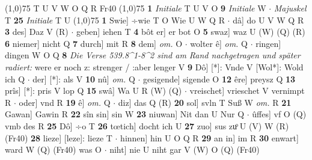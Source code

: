 \documentclass[8pt,a4paper,notitlepage]{article}
\begin{document}
\begin{table}[ht]
\begin{minipage}[t]{0.5\linewidth}
\scriptsize
\line(1,0){75} \newline
T U V W O Q R Fr40 \newline
\line(1,0){75} \newline
\textbf{1} \textit{Initiale} T U V O  \textbf{9} \textit{Initiale} W   $\cdot$ \textit{Majuskel} T  \textbf{25} \textit{Initiale} T U  \newline
\line(1,0){75} \newline
\textbf{1} Swie] ÷wie T O Wie U W Q R  $\cdot$ dâ] do U V W Q R \textbf{3} des] Daz V (R)  $\cdot$ geben] iehen T \textbf{4} bôt er] er bot O \textbf{5} swaz] waz U (W) (Q) (R) \textbf{6} niemer] nicht Q \textbf{7} durch] mit R \textbf{8} dem] \textit{om.} O  $\cdot$ wolter ê] \textit{om.} Q  $\cdot$ ringen] dingen W O Q \textbf{8} \textit{Die Verse 539.8\textasciicircum1-8\textasciicircum2 sind am Rand nachgetragen und später radiert:} were er noch z: strenger / :aber lenger V  \textbf{9} Dô] [*]: Vnde V [Wol*]: Wold ich Q  $\cdot$ der] [*]: als V \textbf{10} nû] \textit{om.} Q  $\cdot$ gesigende] sigende O \textbf{12} êre] preysz Q \textbf{13} prîs] [*]: pris V lop Q \textbf{15} swâ] Wa U R (W) (Q)  $\cdot$ vreischet] vrieschet V vernimpt R  $\cdot$ oder] vnd R \textbf{19} ê] \textit{om.} Q  $\cdot$ diz] das Q (R) \textbf{20} sol] svln T Suß W \textit{om.} R \textbf{21} Gawan] Gawin R \textbf{22} sîn sin] sin W \textbf{23} niuwan] Nit dan U Nur Q  $\cdot$ ûffes] vf O (Q) vmb des R \textbf{25} Dô] ÷o T \textbf{26} tœtich] docht ich U \textbf{27} zuo] sus zuͦ U (V) W (R) (Fr40) \textbf{28} lieze] [leze]: lieze T  $\cdot$ hinnen] hin U O Q R \textbf{29} an in] im R \textbf{30} enwart] ward W (Q) (Fr40) was O  $\cdot$ niht] nie U niht gar V (W) O (Q) (Fr40) \newline
\end{minipage}
\end{table}
\end{document}
